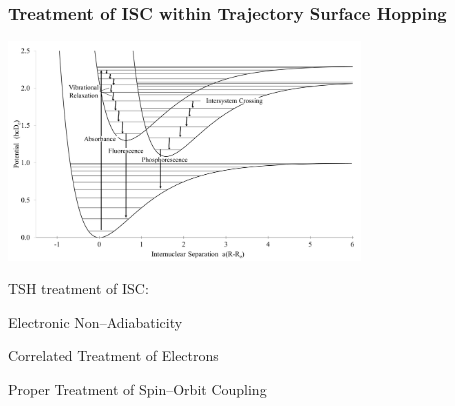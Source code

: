 \documentclass[usepdftitle=false,10pt]{beamer}
\newcommand{\cmark}{\color{green} \ding{51}}%
\newcommand{\xmark}{\color{red} \ding{55}}%
\newcommand{\done}{\rlap{$\square$}{\raisebox{2pt}{\large\hspace{1pt}\cmark}}%
\hspace{-2.5pt}}
\newcommand{\wontfix}{\rlap{$\square$}{\large\hspace{1pt}\xmark}}
\newcommand{\innerop}[3]{\left\langle #1 \left\vert #2 \right\vert #3 \right\rangle}  %
\begin{document}
%
%
%
%
%

\begin{frame}
  \frametitle{Treatment of ISC within Trajectory Surface Hopping}
  \begin{center}
  \includegraphics[width=0.7\textwidth]{ISC} 
  \end{center}
  \vspace{-0.5cm}
  TSH treatment of ISC: 
  \begin{mylist}
    \item[\done] Electronic Non--Adiabaticity
    \item[\done] Correlated Treatment of Electrons
    \item[\wontfix] Proper Treatment of Spin--Orbit Coupling
  \end{mylist}
\end{frame}
\end{document}
